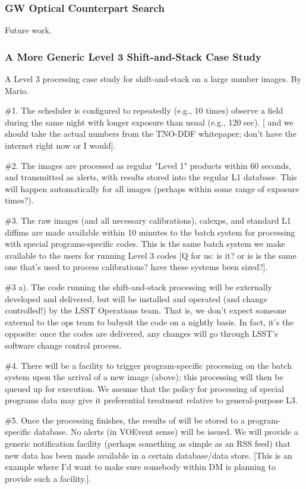 \documentclass[DM,lsstdraft,toc]{lsstdoc}
\begin{document}
\subsubsection{GW Optical Counterpart Search}

Future work.


\subsubsection{A More Generic Level 3 Shift-and-Stack Case Study}\label{sssec:science_dmsums_generic}

A Level 3 processing case study for shift-and-stack on a large number images. By Mario.

\#1. The scheduler is configured to repeatedly (e.g., 10 times) observe a field during the same night with longer exposure than usual (e.g., 120 sec). [ and we should take the actual numbers from the TNO-DDF whitepaper; don't have the internet right now or I would].

\#2. The images are processed as regular "Level 1" products within 60 seconds, and transmitted as alerts, with results stored into the regular L1 database. This will happen automatically for all images (perhaps within some range of exposure times?).

\#3. The raw images (and all necessary calibrations), calexps, and standard L1 diffims are made available within 10 minutes to the batch system for processing with special programs-specific codes. This is the same batch system we make available to the users for running Level 3 codes [Q for us: is it? or is is the same one that's used to process calibrations? have these systems been sized?].

\#3 a). The code running the shift-and-stack processing will be externally developed and delivered, but will be installed and operated (and change controlled!) by the LSST Operations team. That is, we don't expect someone external to the ops team to babysit the code on a nightly basis. In fact, it's the opposite: once the codes are delivered, any changes will go through LSST's software change control process.

\#4. There will be a facility to trigger program-specific processing on the batch system upon the arrival of a new image (above); this processing will then be queued up for execution. We assume that the policy for processing of special programs data may give it preferential treatment relative to general-purpose L3.

\#5. Once the processing finishes, the results of will be stored to a program-specific database. No alerts (in VOEvent sense) will be issued. We will provide a generic notification facility (perhaps something as simple as an RSS feed) that new data has been made available in a certain database/data store. [This is an example where I'd want to make sure somebody within DM is planning to provide such a facility.].
\end{document}
